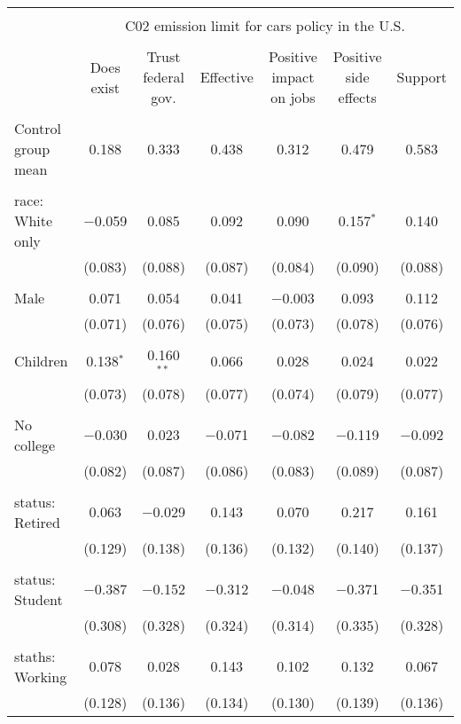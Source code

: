 
\begin{tabular}{@{\extracolsep{5pt}}lcccccc} 
\\[-1.8ex]\hline 
\hline \\[-1.8ex] 
 & \multicolumn{6}{c}{C02 emission limit for cars policy in the U.S.} \\ 
\cline{2-7} 
\\[-1.8ex] & Does exist & Trust federal gov. & Effective & Positive impact on jobs & Positive side effects & Support \\ 
\hline \\[-1.8ex] 
 Control group mean & 0.188 & 0.333 & 0.438 & 0.312 & 0.479 & 0.583  \\ \hline \\[-1.8ex] race: White only & $-$0.059 & 0.085 & 0.092 & 0.090 & 0.157$^{*}$ & 0.140 \\ 
  & (0.083) & (0.088) & (0.087) & (0.084) & (0.090) & (0.088) \\ 
  & & & & & & \\ 
 Male & 0.071 & 0.054 & 0.041 & $-$0.003 & 0.093 & 0.112 \\ 
  & (0.071) & (0.076) & (0.075) & (0.073) & (0.078) & (0.076) \\ 
  & & & & & & \\ 
 Children & 0.138$^{*}$ & 0.160$^{**}$ & 0.066 & 0.028 & 0.024 & 0.022 \\ 
  & (0.073) & (0.078) & (0.077) & (0.074) & (0.079) & (0.077) \\ 
  & & & & & & \\ 
 No college & $-$0.030 & 0.023 & $-$0.071 & $-$0.082 & $-$0.119 & $-$0.092 \\ 
  & (0.082) & (0.087) & (0.086) & (0.083) & (0.089) & (0.087) \\ 
  & & & & & & \\ 
 status: Retired & 0.063 & $-$0.029 & 0.143 & 0.070 & 0.217 & 0.161 \\ 
  & (0.129) & (0.138) & (0.136) & (0.132) & (0.140) & (0.137) \\ 
  & & & & & & \\ 
 status: Student & $-$0.387 & $-$0.152 & $-$0.312 & $-$0.048 & $-$0.371 & $-$0.351 \\ 
  & (0.308) & (0.328) & (0.324) & (0.314) & (0.335) & (0.328) \\ 
  & & & & & & \\ 
 staths: Working & 0.078 & 0.028 & 0.143 & 0.102 & 0.132 & 0.067 \\ 
  & (0.128) & (0.136) & (0.134) & (0.130) & (0.139) & (0.136) \\ 

\end{tabular}
